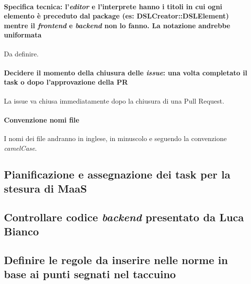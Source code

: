 \documentclass[11pt]{meetingmins}
\begin{document}
	\paragraph*{\textbf{Specifica tecnica}: l'\textit{editor} e l'interprete hanno i titoli in cui ogni elemento è preceduto 
		dal package (es: DSLCreator::DSLElement) mentre il \textit{frontend} e \textit{backend} non lo fanno. La notazione andrebbe uniformata}
		Da definire.
		
		
	\paragraph*{Decidere il momento della chiusura delle \textit{issue}: una volta completato il task o dopo l'approvazione della PR}
		La issue va chiusa immediatamente dopo la chiusura di una Pull Request.
		
	\paragraph*{Convenzione nomi file}
		I nomi dei file andranno in inglese, in minuscolo e seguendo la convenzione \textit{camelCase}.

\subsection{Pianificazione e assegnazione dei task per la stesura di MaaS}


\subsection{Controllare codice \textit{backend} presentato da Luca Bianco}


\subsection{Definire le regole da inserire nelle norme in base ai punti segnati nel taccuino}




\end{document}
